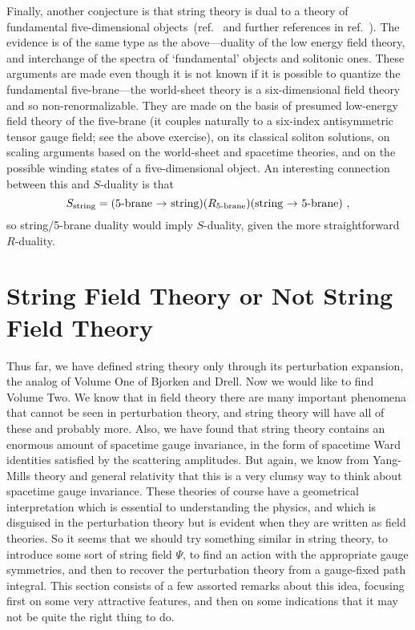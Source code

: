 Finally, another conjecture is that string theory is dual to a theory
of fundamental five-dimensional objects~(ref.~\cite{Ds5d} and
further references in ref.~\cite{Senrev}).  The evidence is of the
same type as the above---duality of the low energy field theory, and
interchange of the spectra of `fundamental' objects and solitonic
ones.  These arguments are made even though it is not known if it is
possible to quantize the fundamental five-brane---the world-sheet
theory is a six-dimensional field theory and so non-renormalizable.
They are made on the basis of presumed low-energy field theory of the
five-brane (it couples naturally to a six-index antisymmetric tensor
gauge field; see the above exercise), on its classical soliton
solutions, on scaling arguments based on the world-sheet and
spacetime theories, and on the possible winding states of a
five-dimensional object.  An interesting connection between this and
$S$-duality is that 
\begin{equation}
S_{\rm string} = 
(\mbox{5-brane $\to$ string}) (R_{\mbox{\scriptsize 5-brane}})
(\mbox{string $\to$ 5-brane})\ ,
\end{equation}
so string/5-brane duality would imply $S$-duality, given the more
straightforward $R$-duality.

\section{String Field Theory or Not String Field Theory}
\setcounter{footnote}{0}

Thus far, we have defined string theory only through its
perturbation expansion, the analog of Volume One of Bjorken and Drell.
Now we would like to find Volume Two.  We know that in field theory
there are many important phenomena that cannot be seen in perturbation
theory, and string theory will have all of these and probably more.
Also, we have found that string theory contains an enormous amount of
spacetime gauge invariance, in the form of spacetime Ward
identities satisfied by the scattering amplitudes.  But again, we
know from Yang-Mills theory and general relativity that this is a
very clumsy way to think about spacetime gauge invariance.  These
theories of course have a geometrical interpretation which is
essential to understanding the physics, and which is
disguised in the perturbation theory but is evident when they are
written as field theories.  So it seems that we should try something
similar in string theory, to introduce some sort of string field
$\Psi$, to find an action with the appropriate gauge symmetries, and
then to recover the perturbation theory from a gauge-fixed path
integral.  This section consists of a few assorted remarks about this
idea, focusing first on some very attractive features, and then 
on some indications that it may not be quite the right
thing to do.


